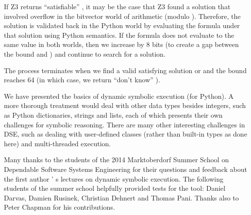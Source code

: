 \documentclass{IOS-Book-Article}
\begin{document}
\begin{mdP}[class={indent},data-line={879}]%
{}If Z3 returns
{}{\textquotedblleft}satisfiable{\textquotedblright}%
{}, it may be the case that Z3 found a solution
that involved overflow in the bitvector world of arithmetic
(modulo %
{}%
{}). Therefore,
the solution is validated back in the
Python world by evaluating the formula under that solution
using Python semantics. 
If the formula does not evaluate to the same
value in both worlds, then we increase %
{}%
{} by 8 bits (to 
create a gap between the bound and %
{}%
{}) and continue to search
for a solution.%
\end{mdP}%
\begin{mdP}[class={indent},data-line={891}]%
{}The process terminates when we find a valid satisfying solution 
or %
{}%
{} and the bound reaches 64 (in which case, we return %
{}{\textquotedblleft}don{'}t know{\textquotedblright}%
{}).%
\end{mdP}%
\begin{mdP}[data-line={896}]%
{}We have presented the basics of dynamic symbolic execution 
(for Python).
A more thorough treatment would deal with other data types besides
integers, such as Python dictionaries, strings and lists, each
of which presents their own challenges for symbolic reasoning. 
There are many other interesting challenges in DSE, such
as dealing with user-defined classes (rather than built-in types
as done here) and multi-threaded execution.%
\end{mdP}%
\begin{mdP}[data-line={907}]%
{}Many thanks to the students of the 2014 Marktoberdorf Summer School
on Dependable Software Systems Engineering
for their questions and feedback about the first author%
{}{'}%
{}s lectures on dynamic
symbolic execution. The following students of the summer school
helpfully provided tests for the%
{}{\mdNbsp}%
{} tool: Daniel Darvas,
Damien Rusinek, Christian Dehnert and Thomas Pani. Thanks also to Peter
Chapman for his contributions.%
\end{mdP}%
\end{document}
